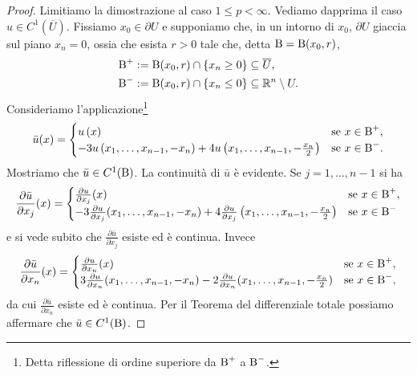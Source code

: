 \begin{proof}
	Limitiamo la dimostrazione al caso $1\le p < \infty$. Vediamo dapprima il caso $u \in C^1(\overline{U})$. Fissiamo $x_0 \in \partial U$ e supponiamo che, in un intorno di $x_0$, $\partial U$ giaccia sul piano $x_n = 0$, ossia che esista $r > 0 $ tale che, detta $\textup{B} = \textup{B}(x_0,r)$,
	\begin{align*}
		\textup{B}^+ &:= \textup{B}(x_0,r) \cap \left\lbrace x_n \ge 0\right\rbrace \subseteq \overline{U}, \\
		\textup{B}^- &:= \textup{B}(x_0,r) \cap \left\lbrace x_n \le 0\right\rbrace \subseteq \mathbb{R}^n \setminus U.
	\end{align*}
	Consideriamo l'applicazione\footnote{Detta riflessione di ordine superiore da $\textup{B}^+$ a $\textup{B}^-$.}
	\[ \bar{u}(x) = \begin{cases}
		u\left( x\right)  & \textup{se } x \in \textup{B}^+,\\
		-3u\left( x_1,\dots, x_{n-1}, -x_n\right)  + 4u\left( x_1,\dots, x_{n-1},-\frac{x_n}{2}\right)  & \textup{se } x \in \textup{B}^-.
	\end{cases} \]
	Mostriamo che $\bar{u} \in C^1(\textup{B})$. La continuità di $\bar{u}$ è evidente. Se $j = 1,\dots,n-1$ si ha
	\[ \frac{\partial \bar{u}}{\partial x_j}(x) = \begin{cases}
		\frac{\partial u}{\partial x_j}(x) & \textup{se } x \in \textup{B}^+,\\
		-3\frac{\partial u}{\partial x_j}(x_1, \dots, x_{n-1},-x_n) + 4\frac{\partial u}{\partial x_j}\left( x_1,\dots, x_{n-1},-\frac{x_n}{2}\right)   & \textup{se } x \in \textup{B}^-
	\end{cases} \]
	e si vede subito che $\frac{\partial \bar{u}}{\partial x_j}$ esiste ed è continua. Invece
	\[ \frac{\partial \bar{u}}{\partial x_n}(x) = \begin{cases}
		\frac{\partial u}{\partial x_n}(x) & \textup{se } x \in \textup{B}^+,\\
		3\frac{\partial u}{\partial x_n}(x_1, \dots, x_{n-1},-x_n) - 2\frac{\partial u}{\partial x_n}(x_1, \dots, x_{n-1},-\frac{x_n}{2})  & \textup{se } x \in \textup{B}^-,
	\end{cases} \]
	da cui $\frac{\partial \bar{u}}{\partial x_n}$ esiste ed è continua. Per il Teorema del differenziale totale possiamo affermare che $\bar{u} \in C^1(\textup{B})$. 
	

\end{proof}
